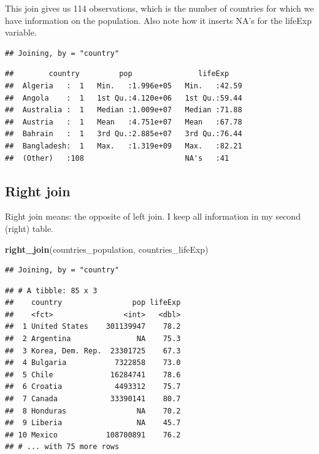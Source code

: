 \documentclass[]{tufte-book}
\newenvironment{Shaded}{}{}
\newcommand{\KeywordTok}[1]{\textcolor[rgb]{0.00,0.44,0.13}{\textbf{#1}}}
\newcommand{\NormalTok}[1]{#1}
\newcommand{\OperatorTok}[1]{\textcolor[rgb]{0.40,0.40,0.40}{#1}}
\newcommand{\StringTok}[1]{\textcolor[rgb]{0.25,0.44,0.63}{#1}}
\begin{document}
This join gives us 114 observations, which is the number of countries for which we have information on the population. Also note how it inserts NA's for the lifeExp variable.

\begin{Shaded}
\end{Shaded}

\begin{verbatim}
## Joining, by = "country"
\end{verbatim}

\begin{verbatim}
##        country         pop               lifeExp     
##  Algeria   :  1   Min.   :1.996e+05   Min.   :42.59  
##  Angola    :  1   1st Qu.:4.120e+06   1st Qu.:59.44  
##  Australia :  1   Median :1.009e+07   Median :71.88  
##  Austria   :  1   Mean   :4.751e+07   Mean   :67.78  
##  Bahrain   :  1   3rd Qu.:2.885e+07   3rd Qu.:76.44  
##  Bangladesh:  1   Max.   :1.319e+09   Max.   :82.21  
##  (Other)   :108                       NA's   :41
\end{verbatim}

\hypertarget{right-join}{%
\subsection{Right join}\label{right-join}}

Right join means: the opposite of left join. I keep all information in my second (right) table.

\begin{Shaded}
\begin{Highlighting}[]
\KeywordTok{right_join}\NormalTok{(countries_population, countries_lifeExp)}
\end{Highlighting}
\end{Shaded}

\begin{verbatim}
## Joining, by = "country"
\end{verbatim}

\begin{verbatim}
## # A tibble: 85 x 3
##    country                pop lifeExp
##    <fct>                <int>   <dbl>
##  1 United States    301139947    78.2
##  2 Argentina               NA    75.3
##  3 Korea, Dem. Rep.  23301725    67.3
##  4 Bulgaria           7322858    73.0
##  5 Chile             16284741    78.6
##  6 Croatia            4493312    75.7
##  7 Canada            33390141    80.7
##  8 Honduras                NA    70.2
##  9 Liberia                 NA    45.7
## 10 Mexico           108700891    76.2
## # ... with 75 more rows
\end{verbatim}
\end{document}
